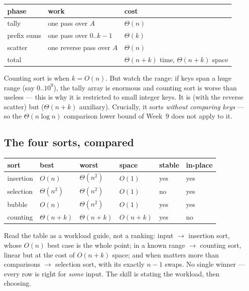 \documentclass[11pt]{article}
\begin{document}
\begin{center}
{\footnotesize
\begin{tabular}{lll}
  \toprule
  \textbf{phase} & \textbf{work} & \textbf{cost} \\
  \midrule
  tally & one pass over $A$ & $\Theta(n)$ \\
  prefix sums & one pass over $0..k-1$ & $\Theta(k)$ \\
  scatter & one reverse pass over $A$ & $\Theta(n)$ \\
  \midrule
  total & & $\Theta(n + k)$ time, $\Theta(n + k)$ space \\
  \bottomrule
\end{tabular}}
\end{center}

Counting sort is  when $k = O(n)$. But watch the range: if keys span a huge range (say $0..10^9$), the tally array is enormous and counting sort is worse than useless --- this is why it is restricted to small integer keys. It is  (with the reverse scatter) but  ($\Theta(n + k)$ auxiliary). Crucially, it sorts \emph{without comparing keys} --- so the $\Theta(n \log n)$ comparison lower bound of Week~9 does not apply to it. \cite{Karumanchi2017_data_structures_algorithms_made_easy}

\subsection{The four sorts, compared}

\begin{center}
{\footnotesize
\begin{tabular}{llllll}
  \toprule
  \textbf{sort} & \textbf{best} & \textbf{worst} & \textbf{space} &
    \textbf{stable} & \textbf{in-place} \\
  \midrule
  insertion & $O(n)$ & $\Theta(n^2)$ & $O(1)$ & yes & yes \\
  selection & $\Theta(n^2)$ & $\Theta(n^2)$ & $O(1)$ & no & yes \\
  bubble & $O(n)$ & $\Theta(n^2)$ & $O(1)$ & yes & yes \\
  counting & $\Theta(n+k)$ & $\Theta(n+k)$ & $O(n+k)$ & yes & no \\
  \bottomrule
\end{tabular}}
\end{center}

Read the table as a workload guide, not a ranking:  input $\to$ insertion sort, whose $O(n)$ best case is the whole point;  in a known range $\to$ counting sort, linear but at the cost of $O(n+k)$ space; and when  matters more than comparisons $\to$ selection sort, with its exactly $n-1$ swaps. No single winner --- every row is right for \emph{some} input. The skill is stating the workload, then choosing.
\end{document}
